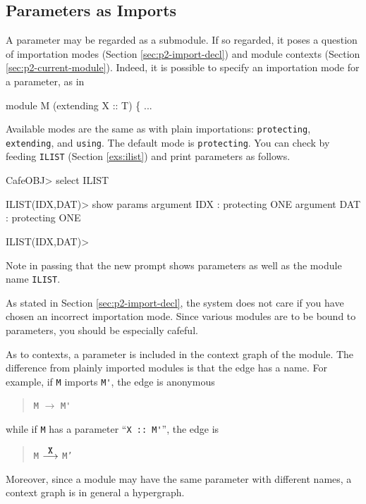 \documentclass[a4paper]{memoir}
\begin{document}
\subsection{Parameters as Imports}\label{sec:p2-params-as-subs}

A parameter may be regarded as a submodule. If so regarded,
it poses a question of importation modes (Section \ref{sec:p2-import-decl})
and module contexts (Section \ref{sec:p2-current-module}).
Indeed, it is possible to specify an importation mode for a parameter, as in
\begin{vvtm}
\begin{ccode}
  module M (extending X :: T) \{ ...
\end{ccode}
\end{vvtm}
Available modes are the same as with plain importations: \verb|protecting|,
\verb|extending|, and \verb|using|. The default mode is \verb|protecting|.
You can check by feeding \verb|ILIST| (Section \ref{exs:ilist}) and
print parameters as follows.
\begin{vvtm}
\begin{ccode}
  CafeOBJ> select ILIST

  ILIST(IDX,DAT)> show params
  argument IDX : protecting ONE
  argument DAT : protecting ONE

  ILIST(IDX,DAT)> 
\end{ccode}
\end{vvtm}
Note in passing that the new prompt shows parameters as well as the module
name \verb|ILIST|.


\begin{warning}
  As stated in Section \ref{sec:p2-import-decl}, the system does not
  care if you have chosen an incorrect importation mode. Since
  various modules are to be bound to parameters, you should be especially
  cafeful.
\end{warning}

As to contexts, a parameter is included in the context graph of the module.
The difference from plainly imported modules is that the edge has
a name. For example, if \verb|M| imports \verb|M'|, the edge is anonymous
\begin{quotation}
  \verb|M| $\longrightarrow$ \verb|M'|
\end{quotation}
while if \verb|M| has a parameter ``\verb|X :: M'|'', the edge is
\begin{quotation}
  \texttt{M} $\buildrel \mbox{\texttt{X}} \over \longrightarrow$ \texttt{M'}
\end{quotation}
Moreover, since a module may have the same parameter with different names,
a context graph is in general a hypergraph.
\end{document}
